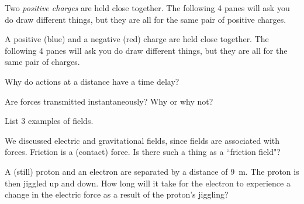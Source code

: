 \documentclass[12pt]{exam}
\begin{document}
\begin{questions}
\question Two \textit{positive charges} are held close together. The following 4 panes will ask you do draw different things, but they are all for the same pair of positive charges.
\begin{center}
	
\end{center}

\clearpage
\question A positive (blue) and a negative (red) charge are held close together. The following 4 panes will ask you do draw different things, but they are all for the same pair of charges.
\begin{center}
	
\end{center}

\clearpage
\question Why do actions at a distance have a time delay?
\vspace{1in}

\question Are forces transmitted instantaneously? Why or why not?
\vspace{1in}

\question List 3 examples of fields.
	\begin{parts}
		\part 
			\vspace{0.1in}
		\part 
			\vspace{0.1in}
		\part 
	\end{parts}

\vspace{0.5in}

\question We discussed electric and gravitational fields, since fields are associated with forces. Friction is a (contact) force. Is there such a thing as a ``friction field"?
\vspace{1in}

\question A (still) proton and an electron are separated by a distance of 9~m. The proton is then jiggled up and down. How long will it take for the electron to experience a change in the electric force as a result of the proton's jiggling?
\vspace{1in}


\end{questions}
\end{document}
